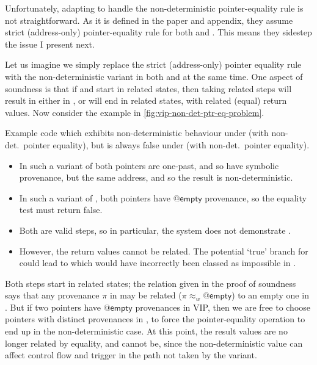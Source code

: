Unfortunately, adapting  to handle the non-deterministic
pointer-equality rule is not straightforward. As it is defined in the paper and
appendix, they assume strict (address-only) pointer-equality rule for both
 and . This means they sidestep the issue I present
next.

Let us imagine we simply replace the strict (address-only) pointer equality
rule with the non-deterministic variant in both  and 
at the same time. One aspect of soundness is that if  and
 start in related states, then taking related steps will result in
either  in , or will end in related states, with related (equal)
return values. Now consider the example in \cref{fig:vip-non-det-ptr-eq-problem}.

\begin{marginfigure}
    \caption{Example code which exhibits non-deterministic behaviour under
         (with non-det.\ pointer equality), but is always false
        under  (with non-det.\ pointer equality).}\label{fig:vip-non-det-ptr-eq-problem}
\end{marginfigure}

\begin{itemize}
    \item In such a variant of  both pointers are one-past, and
        so have symbolic provenance, but the same address, and so the result is
        non-deterministic.
    \item In such a variant of , both pointers have $@\mathsf{empty}$
        provenance, so the equality test must return false.
    \item Both are valid steps, so in particular, the  system does not demonstrate .
    \item However, the return values cannot be related. The potential `true'
        branch for  could lead to  which would have
        incorrectly been classed as impossible in .
\end{itemize}

Both steps start in related states; the relation given in the proof of
soundness says that any provenance $\pi$ in  may be related
($\pi \approx_w @\mathsf{empty}$) to an empty one in . But if two
pointers have $@\mathsf{empty}$ provenances in VIP, then we are free to
choose pointers with distinct provenances in , to force the
pointer-equality operation to end up in the non-deterministic case. At this
point, the result values are no longer related by equality, and cannot be,
since the non-deterministic value can affect control flow and trigger 
in the path not taken by the  variant.


